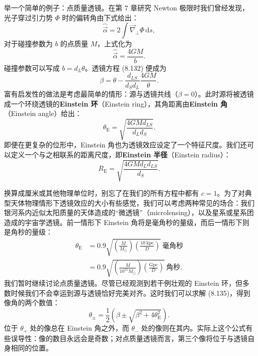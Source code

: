 举一个简单的例子：点质量透镜。在第 7 章研究 Newton 极限时我们曾经发现，光子穿过引力势 $\Phi$ 时的偏转角由下式给出：
\begin{equation*}
\widehat{\vec{\alpha}} = 2\int \vec{\nabla}_{\perp}\Phi\,\mathrm{d}s,
\tag{8.133}
\end{equation*}
对于碰撞参数为 $b$ 的点质量 $M$，上式化为
\begin{equation*}
\widehat{\vec{\alpha}} = \frac{4GM}{b}.
\tag{8.134}
\end{equation*}
碰撞参数可以写成 $b=d_L\theta$。透镜方程 (8.132) 便成为
\begin{equation*}
\beta = \theta - \frac{d_{LS}}{d_S d_L}\frac{4GM}{\theta}.
\tag{8.135}
\end{equation*}
富有启发性的做法是考虑最简单的情形：源与透镜共线（$\beta=0$）。此时源将被透镜成一个环绕透镜的\textbf{Einstein 环}（Einstein ring），其角距离由\textbf{Einstein 角}（Einstein angle）给出：
\begin{equation*}
\theta_{\mathrm{E}} = \sqrt{\frac{4GMd_{LS}}{d_L d_S}}.
\tag{8.136}
\end{equation*}
即便在更复杂的位形中，Einstein 角也为透镜效应设定了一个特征尺度。我们还可以定义一个与之相联系的距离尺度，即\textbf{Einstein 半径}（Einstein radius）：
\begin{equation*}
R_{\mathrm{E}} = \sqrt{\frac{4GMd_L d_{LS}}{d_S}}.
\tag{8.137}
\end{equation*}

换算成厘米或其他物理单位时，别忘了在我们的所有方程中都有 $c=1$。为了对典型天体物理情形下透镜效应的大小有些感觉，我们可以考虑两种常见的场合：我们银河系内近似太阳质量的天体造成的“微透镜”（microlensing），以及星系或星系团造成的宇宙学透镜。前一情形下 Einstein 角将是毫角秒的量级，而后一情形下则是角秒的量级：
\begin{align*}
\theta_{\mathrm{E}} &= 0.9\sqrt{\left(\frac{M}{M_{\odot}}\right)\left(\frac{10\ \mathrm{kpc}}{D}\right)}\ \text{毫角秒}\\
&= 0.9\sqrt{\left(\frac{M}{10^{11}M_{\odot}}\right)\left(\frac{\mathrm{Gpc}}{D}\right)}\ \text{角秒}.
\tag{8.138}
\end{align*}
我们暂时继续讨论点质量透镜。尽管已经观测到若干例壮观的 Einstein 环，但多数时候我们不会幸运到源与透镜恰好完美对齐。这时我们可以求解 (8.135)，得到像角的两个数值：
\begin{equation*}
\theta_{\pm} = \frac{1}{2}\left(\beta \pm \sqrt{\beta^{2}+4\theta_{\mathrm{E}}^{2}}\right).
\tag{8.139}
\end{equation*}
位于 $\theta_{+}$ 处的像总在 Einstein 角之外，而 $\theta_{-}$ 处的像则在其内。实际上这个公式有些误导性：像的数目永远会是奇数；对点质量透镜而言，第三个像将位于与透镜自身相同的位置。

